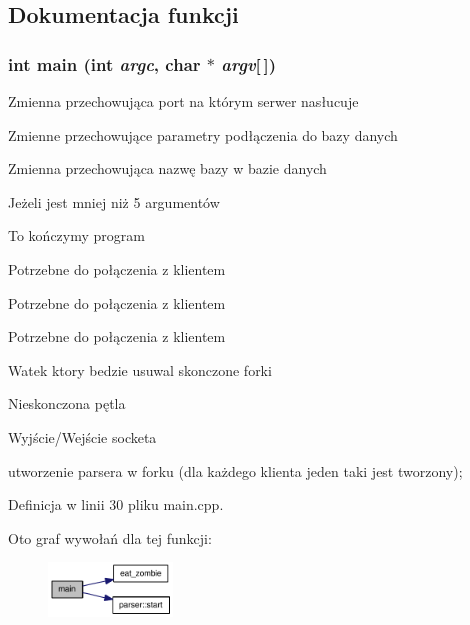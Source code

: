 \subsection{Dokumentacja funkcji}
\hypertarget{a00006_0ddf1224851353fc92bfbff6f499fa97}{
\subsubsection[{main}]{\setlength{\rightskip}{0pt plus 5cm}int main (int {\em argc}, \/  char $\ast$ {\em argv}\mbox{[}$\,$\mbox{]})}}
\label{a00006_0ddf1224851353fc92bfbff6f499fa97}




Zmienna przechowująca port na którym serwer nasłucuje

Zmienne przechowujące parametry podłączenia do bazy danych

Zmienna przechowująca nazwę bazy w bazie danych

Jeżeli jest mniej niż 5 argumentów

To kończymy program

Potrzebne do połączenia z klientem

Potrzebne do połączenia z klientem

Potrzebne do połączenia z klientem

Watek ktory bedzie usuwal skonczone forki

Nieskonczona pętla

Wyjście/Wejście socketa

utworzenie parsera w forku (dla każdego klienta jeden taki jest tworzony); 

Definicja w linii 30 pliku main.cpp.

Oto graf wywołań dla tej funkcji:\nopagebreak
\begin{figure}[H]
\begin{center}
\leavevmode
\includegraphics[width=94pt]{a00006_0ddf1224851353fc92bfbff6f499fa97_cgraph}
\end{center}
\end{figure}
